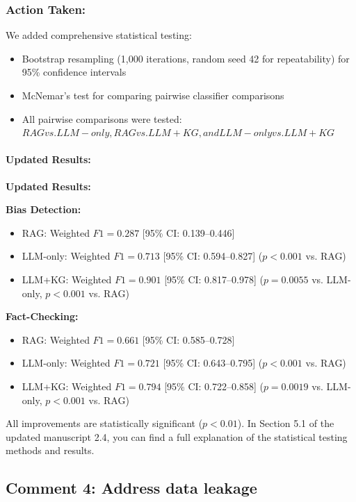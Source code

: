 \documentclass[11pt]{article}
\begin{document}
\subsubsection*{Action Taken:}
We added comprehensive statistical testing:
\begin{itemize}
    \item Bootstrap resampling (1,000 iterations, random seed 42 for repeatability) for 95\% confidence intervals

    \item  McNemar's test for comparing pairwise classifier comparisons
    \item All pairwise comparisons were tested: $RAG vs. LLM-only, RAG vs. LLM+KG, and LLM-only vs. LLM+KG$

\end{itemize}

\paragraph{Updated Results:}
\textbf{Updated Results:}

\textbf{Bias Detection:}
\begin{itemize}
    \item RAG: Weighted $F1 = 0.287$ [95\% CI: 0.139--0.446]
    \item LLM-only: Weighted $F1 = 0.713$ [95\% CI: 0.594–0.827] 
          ($p<0.001$ vs. RAG)
    \item LLM+KG: Weighted $F1 = 0.901$ [95\% CI: 0.817--0.978] 
          ($p=0.0055$ vs. LLM-only, $p<0.001$ vs. RAG)
\end{itemize}

\textbf{Fact-Checking:}
\begin{itemize}
    \item RAG: Weighted $F1 = 0.661$ [95\% CI: 0.585--0.728]
    \item LLM-only: Weighted $F1 = 0.721$ [95\% CI: 0.643--0.795] 
          ($p<0.001$ vs. RAG)
    \item LLM+KG: Weighted $F1 = 0.794$ [95\% CI: 0.722--0.858] 
          ($p=0.0019$ vs. LLM-only, $p<0.001$ vs. RAG)
\end{itemize}

All improvements are statistically significant ($p<0.01$). In Section 5.1 of the updated manuscript 2.4, you can find a full explanation of the statistical testing methods and results. 


\subsection{Comment 4: Address data leakage}
\end{document}
